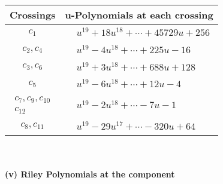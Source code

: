 \documentclass[1p]{elsarticle_modified}
\theoremstyle{definition}
\begin{document}
\begin{tabular}{m{50pt}|m{274pt}}
Crossings & \hspace{64pt}u-Polynomials at each crossing \\
\hline $$\begin{aligned}c_{1}\end{aligned}$$&$\begin{aligned}
&u^{19}+18 u^{18}+\cdots+45729 u+256
\end{aligned}$\\
\hline $$\begin{aligned}c_{2},c_{4}\end{aligned}$$&$\begin{aligned}
&u^{19}-4 u^{18}+\cdots+225 u-16
\end{aligned}$\\
\hline $$\begin{aligned}c_{3},c_{6}\end{aligned}$$&$\begin{aligned}
&u^{19}+3 u^{18}+\cdots+688 u+128
\end{aligned}$\\
\hline $$\begin{aligned}c_{5}\end{aligned}$$&$\begin{aligned}
&u^{19}-6 u^{18}+\cdots+12 u-4
\end{aligned}$\\
\hline $$\begin{aligned}c_{7},c_{9},c_{10}\\c_{12}\end{aligned}$$&$\begin{aligned}
&u^{19}-2 u^{18}+\cdots-7 u-1
\end{aligned}$\\
\hline $$\begin{aligned}c_{8},c_{11}\end{aligned}$$&$\begin{aligned}
&u^{19}-29 u^{17}+\cdots-320 u+64
\end{aligned}$\\
\hline
\end{tabular}\\~\\
\newpage\renewcommand{\arraystretch}{1}
\flushleft \textbf{(v) Riley Polynomials at the component}\newline \\
\end{document}
